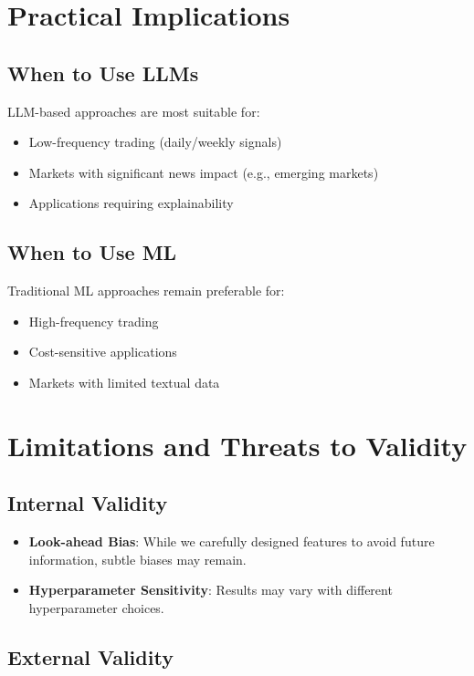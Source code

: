 \section{Practical Implications}

\subsection{When to Use LLMs}

LLM-based approaches are most suitable for:
\begin{itemize}
    \item Low-frequency trading (daily/weekly signals)
    \item Markets with significant news impact (e.g., emerging markets)
    \item Applications requiring explainability
\end{itemize}

\subsection{When to Use ML}

Traditional ML approaches remain preferable for:
\begin{itemize}
    \item High-frequency trading
    \item Cost-sensitive applications
    \item Markets with limited textual data
\end{itemize}

\section{Limitations and Threats to Validity}

\subsection{Internal Validity}

\begin{itemize}
    \item \textbf{Look-ahead Bias}: While we carefully designed features to avoid future information, subtle biases may remain.
    \item \textbf{Hyperparameter Sensitivity}: Results may vary with different hyperparameter choices.
\end{itemize}

\subsection{External Validity}

